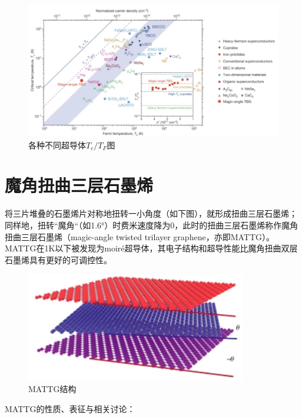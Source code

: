 \begin{figure}
    \centering
    \includegraphics[scale=0.5]{img/载流子密度.png}
    \caption{各种不同超导体$T_c/T_F$图}
\end{figure}

\section{魔角扭曲三层石墨烯}

将三片堆叠的石墨烯片对称地扭转一小角度（如下图），就形成扭曲三层石墨烯；同样地，扭转“魔角“（如1.6°）时费米速度降为0，此时的扭曲三层石墨烯称作魔角扭曲三层石墨烯（magic-angle twisted trilayer graphene，亦即MATTG）。MATTG在1K以下被发现为moiré超导体，其电子结构和超导性能比魔角扭曲双层石墨烯具有更好的可调控性。

\begin{figure}
    \centering
    \includegraphics[scale=0.8]{img/魔角扭曲三层石墨烯.png}
    \caption{MATTG结构}
\end{figure}

MATTG的性质、表征与相关讨论：


